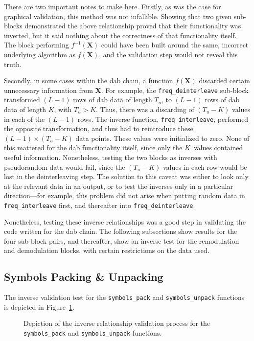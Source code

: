 \documentclass[class=report,11pt,crop=false]{standalone}
\begin{document}
There are two important notes to make here. Firstly, as was the case for graphical validation, this method was not infallible. Showing that two given sub-blocks demonstrated the above relationship proved that their functionality was inverted, but it said nothing about the correctness of that functionality itself. The block performing \(f^{-1}(\mathbf{X})\) could have been built around the same, incorrect underlying algorithm as \(f(\mathbf{X})\), and the validation step would not reveal this truth.

Secondly, in some cases within the \gls{dab} chain, a function \(f(\mathbf{X})\) discarded certain unnecessary information from \(\mathbf{X}\). For example, the \texttt{freq\_deinterleave} sub-block transformed \((L-1)\) rows of \gls{dab} data of length \(T_u\), to \((L-1)\) rows of \gls{dab} data of length \(K\), with \(T_u > K\). Thus, there was a discarding of \((T_u - K)\) values in each of the  \((L-1)\) rows. The inverse function, \texttt{freq\_interleave}, performed the opposite transformation, and thus had to reintroduce these \((L-1)\times(T_u - K)\) data points. These values were initialized to zero. None of this mattered for the \gls{dab} functionality itself, since only the \(K\)~values contained useful information. Nonetheless, testing the two blocks as inverses with pseudorandom data would fail, since the \((T_u - K)\) values in each row would be lost in the deinterleaving step. The solution to this caveat was either to look only at the relevant data in an output, or to test the inverses only in a particular direction---for example, this problem did not arise when putting random data in \texttt{freq\_interleave} first, and thereafter into \texttt{freq\_deinterleave}.

Nonetheless, testing these inverse relationships was a good step in validating the code written for the \gls{dab} chain. The following subsections show results for the four sub-block pairs, and thereafter, show an inverse test for the remodulation and demodulation blocks, with certain restrictions on the data used.

\subsection{Symbols Packing \& Unpacking}
The inverse validation test for the \texttt{symbols\_pack} and \texttt{symbols\_unpack} functions is depicted in Figure~\ref{fig:inverse-symbols-pack-unpack}.

\begin{figure}[htbp]
  \centering
  \captionsetup{type=figure}
  \def\svgwidth{0.95\linewidth}
  { %
      }
  \caption{Depiction of the inverse relationship validation process for the \texttt{symbols\_pack} and \texttt{symbols\_unpack} functions.}
  \label{fig:inverse-symbols-pack-unpack}
\end{figure}
\end{document}

